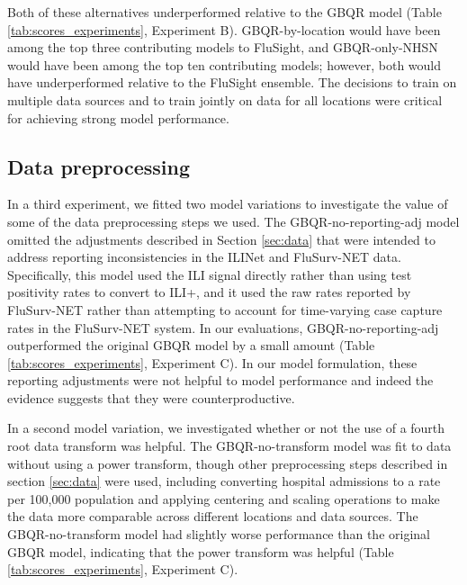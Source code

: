 \documentclass{article}\usepackage[]{graphicx}\usepackage[]{xcolor}
\providecommand{\DIFaddtex}[1]{{\protect\color{blue}\uwave{#1}}} %
\providecommand{\DIFaddbegin}{} %
\providecommand{\DIFaddend}{} %
\providecommand{\DIFadd}[1]{\texorpdfstring{\DIFaddtex{#1}}{#1}} %
\newcommand{\DIFaddincludegraphics}[2][]{{\color{blue}\fbox{\DIFOincludegraphics[#1]{#2}}}} %
\DeclareRobustCommand{\DIFaddbegin}{\DIFOaddbegin \let\includegraphics\DIFaddincludegraphics} %
\DeclareRobustCommand{\DIFaddend}{\DIFOaddend \let\includegraphics\DIFOincludegraphics} %
\begin{document}
Both of these alternatives underperformed relative to the GBQR model \DIFaddbegin \DIFadd{in terms of MWIS, MAE, and interval coverage rates }\DIFaddend (Table \ref{tab:scores_experiments}, Experiment B). GBQR-by-location would have been among the top three contributing models to FluSight, and GBQR-only-NHSN would have been among the top ten contributing models; however, both would have underperformed relative to the FluSight ensemble. The decisions to train on multiple data sources and to train jointly on data for all locations were critical for achieving strong model performance.

\subsection{Data preprocessing}
\label{sec:post-hoc-preprocessing}

In a third experiment, we fitted two model variations to investigate the value of some of the data preprocessing steps we used.  The GBQR-no-reporting-adj model omitted the adjustments described in Section \ref{sec:data} that were intended to address reporting inconsistencies in the ILINet and FluSurv-NET data. Specifically, this model used the ILI signal directly rather than using test positivity rates to convert to ILI+, and it used the raw rates reported by FluSurv-NET rather than attempting to account for time-varying case capture rates in the FluSurv-NET system. In our evaluations, GBQR-no-reporting-adj outperformed the original GBQR model by a small amount (Table \ref{tab:scores_experiments}, Experiment C). In our model formulation, these reporting adjustments were not helpful to model performance and indeed the evidence suggests that they were counterproductive.

In a second model variation, we investigated whether or not the use of a fourth root data transform was helpful. The GBQR-no-transform model was fit to data without using a power transform, though other preprocessing steps described in section \ref{sec:data} were used, including converting hospital admissions to a rate per 100,000 population and applying centering and scaling operations to make the data more comparable across different locations and data sources. The GBQR-no-transform model had slightly worse performance than the original GBQR model, indicating that the power transform was helpful (Table \ref{tab:scores_experiments}, Experiment C).
\end{document}
